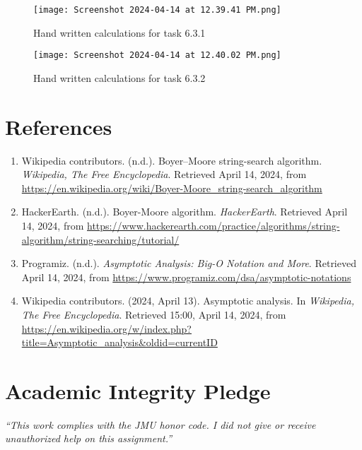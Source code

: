 \documentclass{article}
\begin{document}
\begin{figure}[H]
\centering
\texttt{[image: Screenshot 2024-04-14 at 12.39.41 PM.png]}
\caption{Hand written calculations for task 6.3.1}
\end{figure}

\begin{figure}[H]
\centering
\texttt{[image: Screenshot 2024-04-14 at 12.40.02 PM.png]}
\caption{Hand written calculations for task 6.3.2}
\end{figure}

\newpage
\section*{References}

\begin{enumerate}
    \item Wikipedia contributors. (n.d.). Boyer–Moore string-search algorithm. \textit{Wikipedia, The Free Encyclopedia}. Retrieved April 14, 2024, from \url{https://en.wikipedia.org/wiki/Boyer-Moore_string-search_algorithm}
    \item HackerEarth. (n.d.). Boyer-Moore algorithm. \textit{HackerEarth}. Retrieved April 14, 2024, from \url{https://www.hackerearth.com/practice/algorithms/string-algorithm/string-searching/tutorial/}

    \item Programiz. (n.d.). \textit{Asymptotic Analysis: Big-O Notation and More}. Retrieved April 14, 2024, from \url{https://www.programiz.com/dsa/asymptotic-notations}
    \item Wikipedia contributors. (2024, April 13). Asymptotic analysis. In \textit{Wikipedia, The Free Encyclopedia}. Retrieved 15:00, April 14, 2024, from \url{https://en.wikipedia.org/w/index.php?title=Asymptotic_analysis&oldid=currentID}
\end{enumerate}

\vfill 
  \section*{Academic Integrity Pledge}
   {\color{red}\textit{“This work complies with the JMU honor code. I did not give or receive unauthorized help on this assignment.”}}
\end{document}
